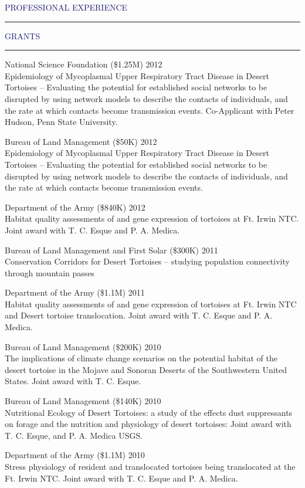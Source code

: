 \documentclass{resume} %
\renewenvironment{rSection}[1]{
\sectionskip
\textcolor{MidnightBlue}{\MakeUppercase{#1}}
\sectionlineskip
\hrule
\begin{list}{}{
\setlength{\leftmargin}{1.5em}
}
\item[]
}{
\end{list}
}
\begin{document}
\begin{rSection}{Professional Experience}
\begin{rSection}{Grants}{}
\item National Science Foundation (\$1.25M) \hfill 2012 \\ 
Epidemiology of Mycoplasmal Upper Respiratory Tract Disease in Desert Tortoises – Evaluating the potential for established social networks to be disrupted by using network models to describe the contacts of individuals, and the rate at which contacts become transmission events. Co-Applicant with Peter Hudson, Penn State University.
\item Bureau of Land Management (\$50K)  \hfill 2012 \\ 
Epidemiology of Mycoplasmal Upper Respiratory Tract Disease in Desert Tortoises – Evaluating the potential for established social networks to be disrupted by using network models to describe the contacts of individuals, and the rate at which contacts become transmission events. 
\item Department of the Army (\$840K)   \hfill 2012 \\ Habitat quality assessments of and gene expression of tortoises at Ft. Irwin NTC. Joint award with T. C. Esque and P. A. Medica.
\item Bureau of Land Management and First Solar (\$300K)  \hfill 2011 \\ 
Conservation Corridors for Desert Tortoises – studying population connectivity through mountain passes
\item Department of the Army (\$1.1M) \hfill 2011 \\ 
Habitat quality assessments of and gene expression of tortoises at Ft. Irwin NTC and Desert tortoise translocation. Joint award with T. C. Esque and P. A. Medica.
\item Bureau of Land Management (\$200K)  \hfill 2010 \\ 
The implications of climate change scenarios on the potential habitat of the desert tortoise in the Mojave and Sonoran Deserts of the Southwestern United States. Joint award with T. C. Esque.
\item Bureau of Land Management (\$140K) \hfill 2010 \\  
Nutritional Ecology of Desert Tortoises: a study of the effects dust suppressants on forage and the nutrition and physiology of desert tortoises: Joint award with T. C. Esque, and P. A. Medica USGS.
\item Department of the Army (\$1.1M) \hfill 2010 \\  
Stress physiology of resident and translocated tortoises being translocated at the Ft. Irwin NTC. Joint award with T. C. Esque and P. A. Medica.

\end{rSection}
\end{rSection}
\end{document}
